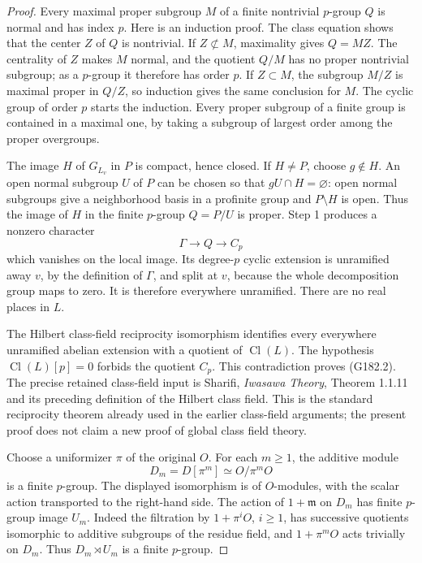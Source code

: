 \begin{proof}
Every maximal proper subgroup $M$ of a finite nontrivial $p$-group $Q$
is normal and has index $p$.  Here is an induction proof.
The class equation shows that the center $Z$ of $Q$ is nontrivial.
If $Z\not\subset M$, maximality gives $Q=MZ$.
The centrality of $Z$ makes $M$ normal, and the quotient $Q/M$ has
no proper nontrivial subgroup; as a $p$-group it therefore has order $p$.
If $Z\subset M$, the subgroup $M/Z$ is maximal proper in $Q/Z$,
so induction gives the same conclusion for $M$.
The cyclic group of order $p$ starts the induction.
Every proper subgroup of a finite group is contained in a maximal one,
by taking a subgroup of largest order among the proper overgroups.

The image $H$ of $G_{L_v}$ in $P$ is compact, hence closed.
If $H\ne P$, choose $g\notin H$.
An open normal subgroup $U$ of $P$ can be chosen so that
$gU\cap H=\varnothing$: open normal subgroups give a neighborhood
basis in a profinite group and $P\setminus H$ is open.
Thus the image of $H$ in the finite $p$-group $Q=P/U$ is proper.
Step 1 produces a nonzero character
\[
                 \Gamma\longrightarrow Q\longrightarrow C_p
 \tag{G182.4}
\]
which vanishes on the local image.
Its degree-$p$ cyclic extension is unramified away $v$, by the
definition of $\Gamma$, and split at $v$, because the whole
decomposition group maps to zero.  It is therefore everywhere
unramified.  There are no real places in $L$.

The Hilbert class-field reciprocity isomorphism identifies every
everywhere unramified abelian extension with a quotient of
$\operatorname{Cl}(L)$.
The hypothesis $\operatorname{Cl}(L)[p]=0$ forbids the quotient $C_p$.
This contradiction proves (G182.2).
The precise retained class-field input is Sharifi,
\emph{Iwasawa Theory}, Theorem 1.1.11 and its preceding definition
of the Hilbert class field.  This is the standard reciprocity theorem
already used in the earlier class-field arguments; the present proof
does not claim a new proof of global class field theory.

Choose a uniformizer $\pi$ of the original $O$.
For each $m\geq1$, the additive module
\[
       D_m=D[\pi^m]\simeq O/\pi^m O
 \tag{G182.5}
\]
is a finite $p$-group.  The displayed isomorphism is of $O$-modules,
with the scalar action transported to the right-hand side.
The action of $1+\mathfrak m$ on $D_m$
has finite $p$-group image $U_m$.
Indeed the filtration by $1+\pi^iO$, $i\geq1$, has successive
quotients isomorphic to additive subgroups of the residue field,
and $1+\pi^mO$ acts trivially on $D_m$.
Thus $D_m\rtimes U_m$ is a finite $p$-group.


\end{proof}
